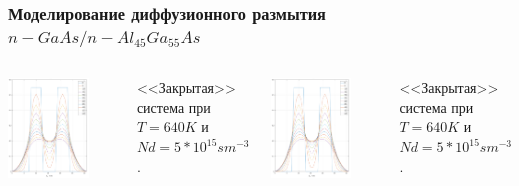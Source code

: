\documentclass[10pt,pdf,hyperref={unicode},aspectratio={169}]{beamer}
\begin{document}
\begin{frame}
	\frametitle{Моделирование диффузионного размытия $n\!-\!GaAs/n\!-\!Al_{45}Ga_{55}As$}
	\begin{columns}
		\begin{center}
			\includegraphics[width=0.75\textwidth]{assets/D1CAlGaAsNd}
		\end{center}
		<<Закрытая>> система при $T = 640K$ и $Nd = 5*10^{15} sm^{-3}$.
		\begin{center}
			\includegraphics[width=0.75\textwidth]{assets/D1CAlGaAsNd}
		\end{center}
		<<Закрытая>> система при $T = 640K$ и $Nd = 5*10^{15} sm^{-3}$.
	\end{columns}
\end{frame}
\end{document}
